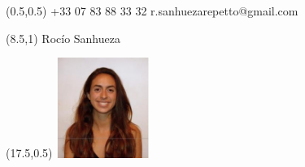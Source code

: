 \documentclass{tccv}
\begin{document}


\begin{textblock}{6.5}(0.5,0.5)
    {+33 07 83 88 33 32}
    {r.sanhuezarepetto@gmail.com}
\end{textblock}

\begin{textblock}{10}(8.5,1)
     Roc\'io Sanhueza
\end{textblock}

\begin{textblock}{21}(17.5,0.5)
		\includegraphics[width=3cm]{../Figure/Rocio1.png}
\end{textblock}  
\end{document}
